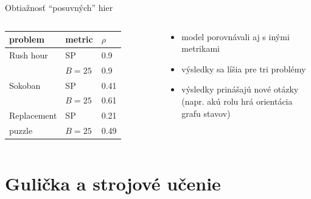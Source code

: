 \documentclass[xcolor={table}]{beamer}
\begin{document}
    		\begin{frame}{Obtiažnosť ``posuvných'' hier}
    			\begin{columns}
\begin{table}[width=\textwidth]
\centering
\begin{tabular}{ll|l}
problem     & metric & $\rho$ \\ \hline
Rush hour   & SP     & 0.9        \\
            & $B = 25$ & 0.9        \\ \hline
Sokoban     & SP     & 0.41       \\
            & $B = 25$ & 0.61       \\ \hline
Replacement & SP     & 0.21       \\
puzzle      & $B = 25$ & 0.49      
\end{tabular}
\end{table}
    				\begin{block}{}
    					\begin{itemize}
    						\item model porovnávali aj s inými metrikami
    						\item výsledky sa líšia pre tri problémy
    						\item výsledky prinášajú nové otázky (napr. akú rolu hrá orientácia grafu stavov)
    					\end{itemize}
    				\end{block}
    			\end{columns}
    		\end{frame}     		  	
    		 		
      					
	\section{Gulička a strojové učenie}
\end{document}

